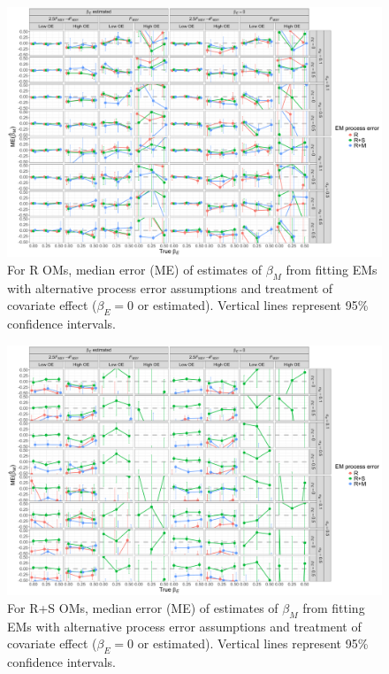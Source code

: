 \documentclass[
  12pt,
]{article}
\begin{document}
\begin{landscape}
\begin{figure}
\begin{center}
\includegraphics[height = \textheight]{beta_M_bias_Rom}
\end{center}
\caption{For R OMs, median error (ME) of estimates of $\beta_M$ from fitting EMs with alternative process error assumptions and treatment of covariate effect ($\beta_E = 0$ or estimated). Vertical lines represent 95\% confidence intervals.}\label{beta_M_bias_Rom}
\end{figure}
\end{landscape}

\begin{landscape}
\begin{figure}
\begin{center}
\includegraphics[height = \textheight]{beta_M_bias_RSom}
\end{center}
\caption{For R+S OMs, median error (ME) of estimates of $\beta_M$ from fitting EMs with alternative process error assumptions and treatment of covariate effect ($\beta_E = 0$ or estimated). Vertical lines represent 95\% confidence intervals.}\label{beta_M_bias_RSom}
\end{figure}
\end{landscape}
\end{document}
